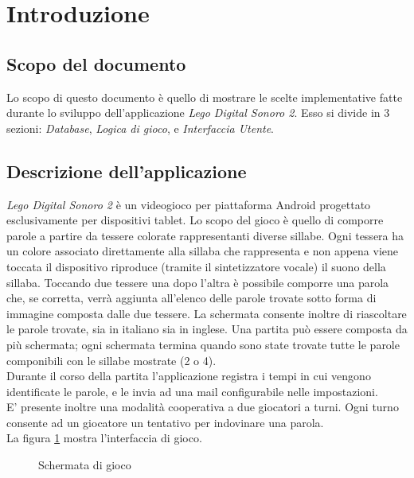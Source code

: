 


\section{Introduzione}


\subsection{Scopo del documento}
Lo scopo di questo documento è quello di mostrare le scelte implementative fatte durante lo sviluppo dell'applicazione \textit{Lego Digital Sonoro 2}. Esso si divide in $3$ sezioni: \textit{Database}, \textit{Logica di gioco}, e \textit{Interfaccia Utente}.

\subsection{Descrizione dell'applicazione}
\textit{Lego Digital Sonoro 2} è un videogioco per piattaforma Android progettato esclusivamente per dispositivi tablet. Lo scopo del gioco è quello di comporre parole a partire da tessere colorate rappresentanti diverse sillabe. Ogni tessera ha un colore associato direttamente alla sillaba che rappresenta e non appena viene toccata il dispositivo riproduce (tramite il sintetizzatore vocale) il suono della sillaba. Toccando due tessere una dopo l'altra è possibile comporre una parola che, se corretta, verrà aggiunta all'elenco delle parole trovate sotto forma di immagine composta dalle due tessere. La schermata consente inoltre di riascoltare le parole trovate, sia in italiano sia in inglese. Una partita può essere composta da più schermata; ogni schermata termina quando sono state trovate tutte le parole componibili con le sillabe mostrate (2 o 4).\\
Durante il corso della partita l'applicazione registra i tempi in cui vengono identificate le parole, e le invia ad una mail configurabile nelle impostazioni.\\
E' presente inoltre una modalità cooperativa a due giocatori a turni. Ogni turno consente ad un giocatore un tentativo per indovinare una parola.\\
La figura \ref{fig:play_ui} mostra l'interfaccia di gioco.

\begin{figure}[h!]
\label{fig:play_ui}
  \centering
  \caption{Schermata di gioco}
\end{figure}
